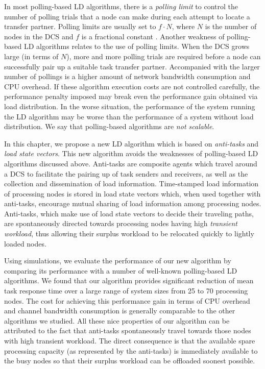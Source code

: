 In most polling-based LD algorithms, there is a
{\it polling limit\/} to control the number of polling trials that a node
can make during each attempt to locate a transfer partner.
Polling limits are usually set to $f \cdot N$, where $N$ is the number
of nodes in the DCS and $f$ is a fractional constant
\cite{eager86a,lu95b}.
%
Another weakness of polling-based LD algorithms relates to
the use of polling limits.
When the DCS grows large (in terms of $N$),
more and more polling trials are required before a node can successfully
pair up a suitable task transfer partner.
%
Accompanied with the larger number of pollings is
a higher amount of network bandwidth consumption and CPU overhead.
If these algorithm execution costs are not controlled carefully,
the performance penalty imposed may break even the
performance gain obtained via load distribution.
In the worse situation, the performance of the system
running the LD algorithm may be worse than the performance of 
a system without load distribution.
We say that polling-based algorithms are {\it not scalable\/}.


In this chapter,
we propose a new LD algorithm which is based on
{\it anti-tasks\/} and {\it load state vectors\/}.
This new algorithm avoids the weaknesses of polling-based LD algorithms
discussed above.
%
Anti-tasks are composite agents which travel around a DCS
to facilitate the pairing up of task senders and receivers,
as well as the collection and dissemination of load information.
%
Time-stamped load information of processing nodes is stored in
load state vectors which, when used together with anti-tasks,
encourage mutual sharing of load information among processing nodes.
%
Anti-tasks, which make use of load state vectors to decide
their traveling paths, are spontaneously directed towards
processing nodes having high {\it transient workload\/},
thus allowing their surplus workload to be relocated quickly
to lightly loaded nodes.

Using simulations, we evaluate the performance of our new algorithm by comparing
its performance with a number of well-known polling-based
LD algorithms.
We found that our algorithm provides significant reduction
of mean task response time over a large range of system sizes 
from 25 to 70 processing nodes.
The cost for achieving this performance gain in terms of
CPU overhead and channel bandwidth consumption is generally 
comparable to the other algorithms we studied.
All these nice properties of our algorithm can be attributed
to the fact that anti-tasks spontaneously travel towards those nodes
with high transient workload.  
The direct consequence is that
the available spare processing capacity (as represented by the anti-tasks)
is immediately available to the busy nodes so that their
surplus workload can be offloaded soonest possible.


